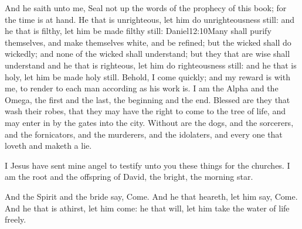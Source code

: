 And he saith unto me, Seal not up the words of the prophecy of this book; for the time is at hand. 
He that is unrighteous, let him do unrighteousness still: and he that is filthy, let him be made filthy still:%
					{Daniel}{12:10}{Many shall purify themselves, and make themselves white, and be refined; but the wicked shall do wickedly; and none of the wicked shall understand; but they that are wise shall understand} %
 and he that is righteous, let him do righteousness still: and he that is holy, let him be made holy still.%
Behold, I come quickly; and my reward is with me, to render to each man according as his work is. 
I am the Alpha and the Omega, the first and the last, the beginning and the end. 
Blessed are they that wash their robes, that they may have the right to come to the tree of life, and may enter in by the gates into the city.%
 Without are the dogs, and the sorcerers, and the fornicators, and the murderers, and the idolaters, and every one that loveth and maketh a lie.

I Jesus have sent mine angel%
 to testify unto you these things for the churches. I am the root and the offspring of David, the bright, the morning star.%

And the Spirit and the bride say, Come. And he that heareth, let him say, Come. And he that is athirst, let him come: he that will, let him take the water of life freely.%


